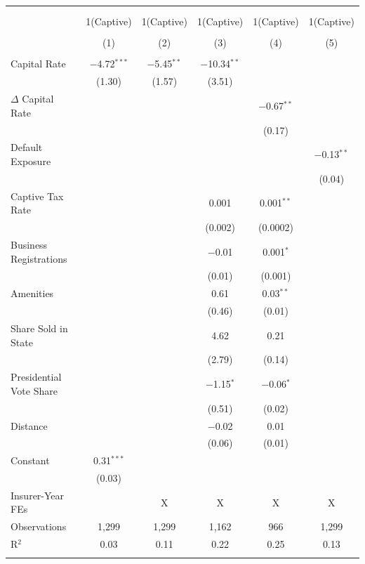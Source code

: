 
\begin{tabular}{@{\extracolsep{5pt}}lccccc} 
\\[-1.8ex]\hline 
\hline \\[-1.8ex] 
\\[-1.8ex] & 1(Captive) & 1(Captive) & 1(Captive) & 1(Captive) & 1(Captive) \\ 
\\[-1.8ex] & (1) & (2) & (3) & (4) & (5)\\ 
\hline \\[-1.8ex] 
 Capital Rate & $-$4.72$^{***}$ & $-$5.45$^{**}$ & $-$10.34$^{**}$ &  &  \\ 
  & (1.30) & (1.57) & (3.51) &  &  \\ 
  $\Delta$ Capital Rate &  &  &  & $-$0.67$^{**}$ &  \\ 
  &  &  &  & (0.17) &  \\ 
  Default Exposure &  &  &  &  & $-$0.13$^{**}$ \\ 
  &  &  &  &  & (0.04) \\ 
  Captive Tax Rate &  &  & 0.001 & 0.001$^{**}$ &  \\ 
  &  &  & (0.002) & (0.0002) &  \\ 
  Business Registrations &  &  & $-$0.01 & 0.001$^{*}$ &  \\ 
  &  &  & (0.01) & (0.001) &  \\ 
  Amenities &  &  & 0.61 & 0.03$^{**}$ &  \\ 
  &  &  & (0.46) & (0.01) &  \\ 
  Share Sold in State &  &  & 4.62 & 0.21 &  \\ 
  &  &  & (2.79) & (0.14) &  \\ 
  Presidential Vote Share &  &  & $-$1.15$^{*}$ & $-$0.06$^{*}$ &  \\ 
  &  &  & (0.51) & (0.02) &  \\ 
  Distance &  &  & $-$0.02 & 0.01 &  \\ 
  &  &  & (0.06) & (0.01) &  \\ 
  Constant & 0.31$^{***}$ &  &  &  &  \\ 
  & (0.03) &  &  &  &  \\ 
 Insurer-Year FEs &  & X & X & X & X \\ 
Observations & 1,299 & 1,299 & 1,162 & 966 & 1,299 \\ 
R$^{2}$ & 0.03 & 0.11 & 0.22 & 0.25 & 0.13 \\ 
\hline \\[-1.8ex] 
\end{tabular} 
